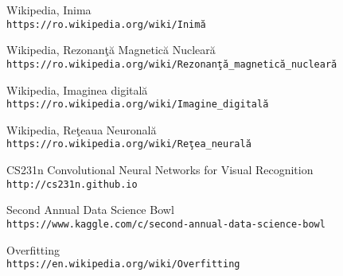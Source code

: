 \begin{thebibliography}{9} 

Wikipedia, Inima
\\\texttt{https://ro.wikipedia.org/wiki/Inim\u{a}}

Wikipedia, Rezonan\c{t}\u{a} Magnetic\u{a} Nuclear\u{a}
\\\texttt{https://ro.wikipedia.org/wiki/Rezonan\c{t}\u{a}\_magnetic\u{a}\_nuclear\u{a}}

Wikipedia, Imaginea digital\u{a}
\\\texttt{https://ro.wikipedia.org/wiki/Imagine\_digital\u{a}}

Wikipedia, Re\c{t}eaua Neuronal\u{a}
\\\texttt{https://ro.wikipedia.org/wiki/Re\c{t}ea\_neural\u{a}}

CS231n Convolutional Neural Networks for Visual Recognition
\\\texttt{http://cs231n.github.io}

Second Annual Data Science Bowl
\\\texttt{https://www.kaggle.com/c/second-annual-data-science-bowl}

Overfitting
\\\texttt{https://en.wikipedia.org/wiki/Overfitting}

\end{thebibliography}